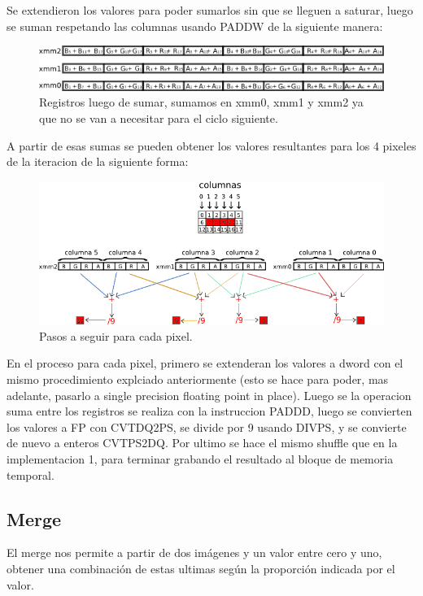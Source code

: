 \documentclass[a4paper]{article}
\begin{document}
Se extendieron los valores para poder sumarlos sin que se lleguen a saturar, luego se suman respetando las columnas usando PADDW de la siguiente manera:

\begin{figure}[H]
\centering
\includegraphics[scale=0.8]{imagenes/blur2add.png}
\caption{Registros luego de sumar, sumamos en xmm0, xmm1 y xmm2 ya que no se van a necesitar para el ciclo siguiente.}
\label{b2unpack}
\end{figure}

A partir de esas sumas se pueden obtener los valores resultantes para los 4 pixeles de la iteracion de la siguiente forma:

\begin{figure}[H]
\centering
\includegraphics[scale=0.8]{imagenes/blur2end.png}
\caption{Pasos a seguir para cada pixel.}
\label{b2endprocess}
\end{figure}

En el proceso para cada pixel, primero se extenderan los valores a dword con el mismo procedimiento explciado anteriormente (esto se hace para poder, mas adelante, pasarlo a single precision floating point in place). Luego se la operacion suma entre los registros se realiza con la instruccion PADDD, luego se convierten los valores a FP con CVTDQ2PS, se divide por 9 usando DIVPS, y se convierte de nuevo a enteros CVTPS2DQ. Por ultimo se hace el mismo shuffle que en la implementacion 1, para terminar grabando el resultado al bloque de memoria temporal.


\subsection{Merge}

El merge nos permite a partir de dos imágenes y un valor entre cero y uno, obtener una combinación de estas ultimas según la proporción indicada por el valor.
\end{document}
